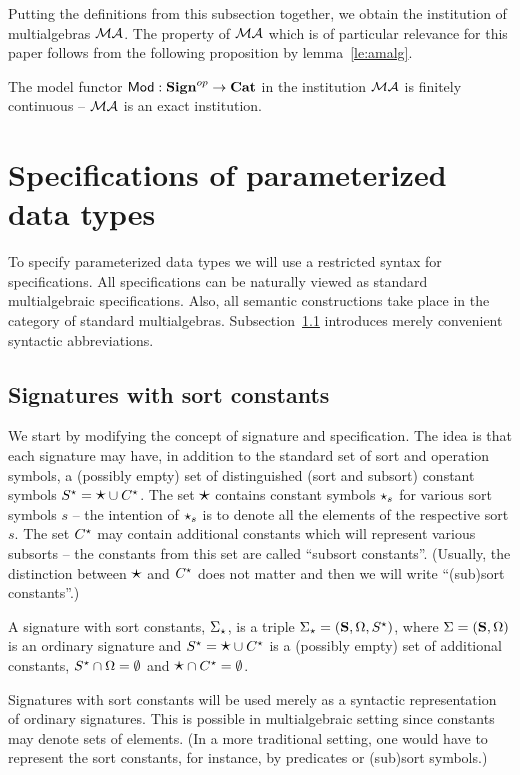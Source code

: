%
Putting the definitions from this subsection together, we obtain the institution of 
multialgebras ${\mathcal{MA}}$.
The property of ${\mathcal{MA}}$ which is of particular relevance for this paper
follows from the following proposition by lemma~\ref{le:amalg}.
\begin{proposition}
The model functor ${\sf {Mod}}:{\bf Sign}^{op}\to{\bf Cat}$ in the institution
${\mathcal{MA}}$ is finitely continuous -- ${\mathcal{MA}}$ is an exact institution.
\end{proposition}

\section{Specifications of parameterized data types}\label{se:paraADT}
To specify parameterized data types we will use a restricted syntax for
specifications. All specifications can be naturally viewed as standard
multialgebraic specifications. Also, all semantic constructions take place in
the category of standard multialgebras. Subsection~\ref{sub:gsp} introduces
merely convenient syntactic abbreviations. 


\subsection{Signatures with sort constants}\label{sub:gsp}
We start by modifying the concept of signature and specification. The idea
is that each signature may have, in addition to the standard set of sort and
operation symbols, a (possibly empty) set of distinguished (sort and subsort) constant
symbols $S^\star = \mbox{\Large{$\star$}}\cup C^\star$. 
The set $\mbox{\Large{$\star$}}$ %
contains  constant symbols
$\star_s$ for various sort symbols $s$ -- the intention of $\star_s$ is to denote all the elements of the respective
sort $s$. 
The set $C^\star$  may contain additional constants
which will represent various subsorts -- the constants from this set are
called ``subsort constants''. (Usually, the distinction between $\mbox{\Large{$\star$}}$ and
$C^\star$ does not matter and then we will write ``(sub)sort constants''.)
\begin{definition}
\label{def:modsign}
A signature with sort constants, $\Sigma_\star$, is a triple $\Sigma_\star =
 ({\bf S},\Omega,S^\star)$, where $\Sigma=({\bf S},\Omega)$ is an ordinary
 signature and $S^\star=\mbox{\Large{$\star$}}\cup C^\star$ is a (possibly empty) set of additional constants,
 $S^\star\cap\Omega=\emptyset$ and $\mbox{\Large{$\star$}}\cap C^\star=\emptyset$. 
\end{definition}
%
Signatures with sort constants will be used merely as a syntactic representation of 
ordinary signatures. This is possible in multialgebraic setting since
constants may denote sets of elements. (In a more traditional setting, one would
have to represent the sort constants, for instance, by predicates or (sub)sort symbols.)

